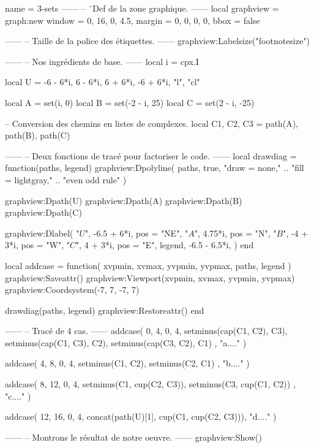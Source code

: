 \documentclass{standalone}
\begin{document}
\begin{luadraw}{name = 3-sets}
------
-- ¨Def de la zone graphique.
------
local graphview = graph:new{
  window = {0, 16, 0, 4.5},
  margin = {0, 0, 0, 0},
  bbox = false
}

------
-- Taille de la police des étiquettes.
------
graphview:Labelsize("footnotesize")

------
-- Nos ingrédients de base.
------
local i = cpx.I

local U = {
  -6 - 6*i, 6 - 6*i, 6 + 6*i, -6 + 6*i,
  "l",
  "cl"
}

local A = set(i, 0)
local B = set(-2 - i, 25)
local C = set(2 - i, -25)

-- Conversion des chemins en listes de complexes.
local C1, C2, C3 = path(A), path(B), path(C)

------
-- Deux fonctions de tracé pour factoriser le code.
------
local drawdiag = function(paths, legend)
  graphview:Dpolyline(
    paths,
    true,
       "draw = none,"
    .. "fill = lightgray,"
    .. "even odd rule"
  )

  graphview:Dpath(U)
  graphview:Dpath(A)
  graphview:Dpath(B)
  graphview:Dpath(C)

  graphview:Dlabel(
    "$U$", -6.5 + 6*i, {pos = "NE"},
    "$A$", 4.75*i, {pos = "N"},
    "$B$", -4 + 3*i, {pos = "W"},
    "$C$", 4 + 3*i, {pos = "E"},
    legend, -6.5 - 6.5*i, {}
  )
end

local addcase = function(
    xvpmin, xvmax, yvpmin, yvpmax,
    paths,
    legend
)
  graphview:Saveattr()
    graphview:Viewport(xvpmin, xvmax, yvpmin, yvpmax)
    graphview:Coordsystem(-7, 7, -7, 7)

    drawdiag(paths, legend)
  graphview:Restoreattr()
end

------
-- Tracé de 4 cas.
------
addcase(
  0, 4, 0, 4,
  {
    setminus(cap(C1, C2), C3),
    setminus(cap(C1, C3), C2),
    setminus(cap(C3, C2), C1)
  },
  "a...."
)

addcase(
  4, 8, 0, 4,
  {
    setminus(C1, C2),
    setminus(C2, C1)
  },
  "b...."
)

addcase(
  8, 12, 0, 4,
  {
    setminus(C1, cup(C2, C3)),
    setminus(C3, cup(C1, C2))
  },
  "c...."
)

addcase(
  12, 16, 0, 4,
  concat(path(U)[1], cup(C1, cup(C2, C3))),
  "d...."
)

------
-- Montrons le résultat de notre oeuvre.
------
graphview:Show()
\end{luadraw}
\end{document}
